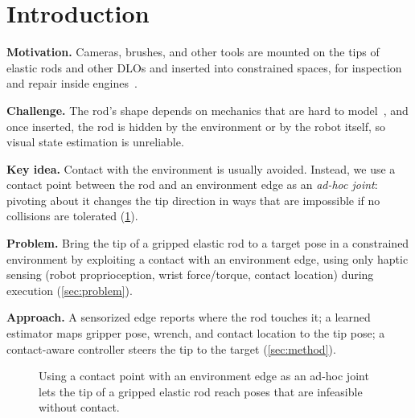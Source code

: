 \section{Introduction}
\label{sec:intro}

\begin{outline}
  \item \textbf{Motivation.} Cameras, brushes, and other tools are mounted on
    the tips of elastic rods and other DLOs and inserted into constrained
    spaces, \eg for inspection and repair inside engines~\cite{dong2017slender}.
  \item \textbf{Challenge.} The rod's shape depends on mechanics that are hard
    to model~\cite{sanchez2018survey}, and once inserted, the rod is hidden by
    the environment or by the robot itself, so visual state estimation is
    unreliable.
  \item \textbf{Key idea.} Contact with the environment is usually avoided.
    Instead, we use a contact point between the rod and an environment edge as
    an \emph{ad-hoc joint}: pivoting about it changes the tip direction in ways
    that are impossible if no collisions are tolerated (\cref{fig:teaser}).
  \item \textbf{Problem.} Bring the tip of a gripped elastic rod to a target
    pose in a constrained environment by exploiting a contact with an
    environment edge, using only haptic sensing (robot proprioception, wrist
    force/torque, contact location) during execution (\cref{sec:problem}).
  \item \textbf{Approach.} A sensorized edge reports where the rod touches it;
    a learned estimator maps gripper pose, wrench, and contact location to the
    tip pose; a contact-aware controller steers the tip to the target
    (\cref{sec:method}).
\end{outline}

\begin{figure}[t]
  \centering
  \caption{Using a contact point with an environment edge as an ad-hoc joint
    lets the tip of a gripped elastic rod reach poses that are infeasible
    without contact.}
  \label{fig:teaser}
\end{figure}

